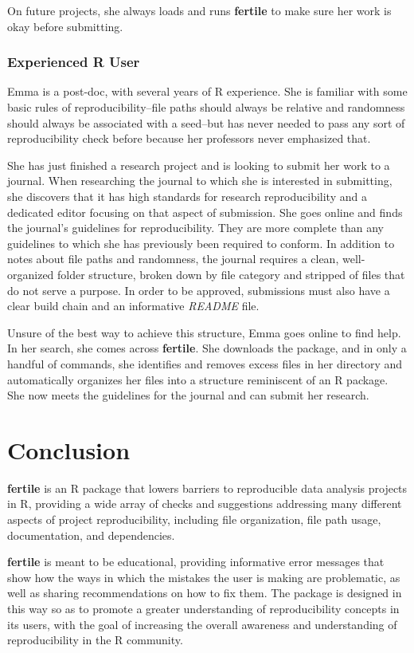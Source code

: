 \documentclass[APA,LATO1COL]{WileyNJD-v2}
\begin{document}
On future projects, she always loads and runs \textbf{fertile} to make sure her work is okay before submitting.

\subsubsection{Experienced R User}

Emma is a post-doc, with several years of R experience. She is familiar with some basic rules of reproducibility--file paths should always be relative and randomness should always be associated with a seed--but has never needed to pass any sort of reproducibility check before because her professors never emphasized that.

She has just finished a research project and is looking to submit her work to a journal. When researching the journal to which she is interested in submitting, she discovers that it has high standards for research reproducibility and a dedicated editor focusing on that aspect of submission. She goes online and finds the journal's guidelines for reproducibility. They are more complete than any guidelines to which she has previously been required to conform. In addition to notes about file paths and randomness, the journal requires a clean, well-organized folder structure, broken down by file category and stripped of files that do not serve a purpose. In order to be approved, submissions must also have a clear build chain and an informative \textit{README} file.

Unsure of the best way to achieve this structure, Emma goes online to find help. In her search, she comes across \textbf{fertile}. She downloads the package, and in only a handful of commands, she identifies and removes excess files in her directory and automatically organizes her files into a structure reminiscent of an R package. She now meets the guidelines for the journal and can submit her research.


\section{Conclusion}\label{sec4}


\textbf{fertile} is an R package that lowers barriers to reproducible data analysis projects in R, providing a wide array of checks and suggestions addressing many different aspects of project reproducibility, including file organization, file path usage, documentation, and dependencies.

\textbf{fertile} is meant to be educational, providing informative error messages that show how the ways in which the mistakes the user is making are problematic, as well as sharing recommendations on how to fix them. The package is designed in this way so as to promote a greater understanding of reproducibility concepts in its users, with the goal of increasing the overall awareness and understanding of reproducibility in the R community.
\end{document}
